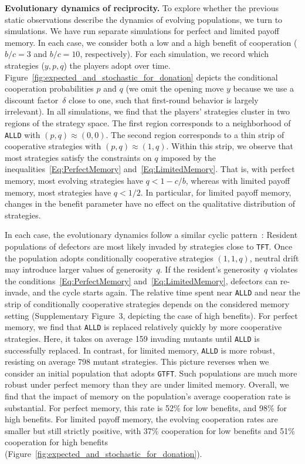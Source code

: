 \documentclass[11pt]{article}
\def\alld{\texttt{ALLD}}
\def\tft{\texttt{TFT}}
\def\gtft{\texttt{GTFT}}
\newcommand{\FigBaseResults}{Figure~\ref{fig:expected_and_stochastic_for_donation}}
\newcommand{\FigInvasionAnalysis}{{Supplementary Figure~3}}
\theoremstyle{plainCl1}
\theoremstyle{plainCl2}
\begin{document}
\noindent
{\bf Evolutionary dynamics of reciprocity.}
To explore whether the previous static observations describe the dynamics of evolving populations, we turn to simulations.
We have run separate simulations for perfect and limited payoff memory. 
In each case, we consider both a low and a high benefit of cooperation ($b/c\!=\!3$ and $b/c\!=\!10$, respectively).  
For each simulation, we record which strategies ($y,p,q$) the players adopt over time.
\FigBaseResults{} depicts the conditional cooperation probabilities $p$ and $q$ (we omit the opening move \(y\) because we use a discount factor~\(\delta\) close to one, such that first-round behavior is largely irrelevant). 
In all simulations, we find that the players' strategies cluster in two regions of the strategy space. 
The first region corresponds to a neighborhood of \alld{} with $(p,q)\!\approx\!(0,0)$.
The second region corresponds to a thin strip of cooperative strategies with $(p,q)\!\approx\!(1,q)$. 
Within this strip, we observe that most strategies satisfy the constraints on $q$ imposed by the inequalities~\eqref{Eq:PerfectMemory} and~\eqref{Eq:LimitedMemory}. 
That is, with perfect memory, most evolving strategies have $q\!<\!1\!-\!c/b$, whereas with limited payoff memory, most strategies have $q\!<\!1/2$. 
In particular, for limited payoff memory, changes in the benefit parameter have no effect on the qualitative distribution of strategies. 


In each case, the evolutionary dynamics follow a similar cyclic pattern~\citep[as described in Refs.][]{imhof2010stochastic, Nowak1992tit}:
Resident populations of defectors are most likely invaded by strategies close to \tft. 
Once the population adopts conditionally cooperative strategies  $(1,1,q)$, neutral drift may introduce larger values of generosity~$q$. 
If the resident's generosity~$q$ violates the conditions~\eqref{Eq:PerfectMemory} and~\eqref{Eq:LimitedMemory}, defectors can re-invade, and the cycle starts again. 
The relative time spent near \alld{} and near the strip of conditionally cooperative strategies depends on the considered memory setting (\FigInvasionAnalysis, depicting the case of high benefits). 
For perfect memory, we find that \alld{} is replaced relatively quickly by more cooperative strategies. 
Here, it takes on average 159 invading mutants until \alld{} is successfully replaced. 
In contrast, for limited memory, \alld{} is more robust, resisting on average 798 mutant strategies. 
This picture reverses when we consider an initial population that adopts \gtft. 
Such populations are much more robust under perfect memory than they are under limited memory. 
Overall, we find that the impact of memory on the population's average cooperation rate is substantial. 
For perfect memory, this rate is 52\% for low benefits, and 98\% for high benefits. 
For limited payoff memory, the evolving cooperation rates are smaller but still strictly positive, with 37\% cooperation for low benefits and 51\% cooperation for high benefits (\FigBaseResults). 
\end{document}
